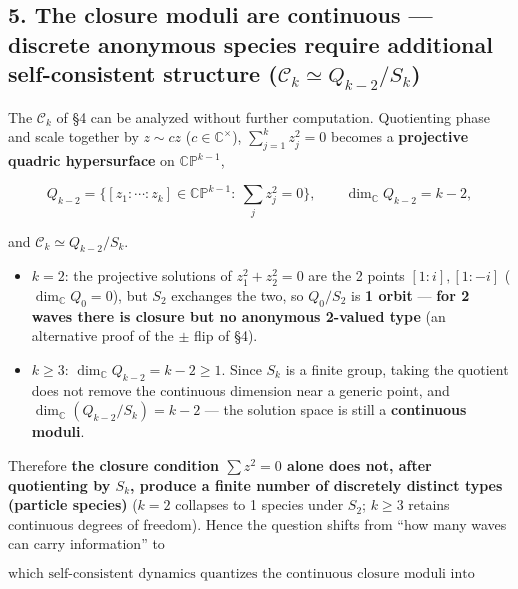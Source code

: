 \documentclass[
  a4paper,
]{ltjsarticle}
\providecommand{\tightlist}{%
  \setlength{\itemsep}{0pt}\setlength{\parskip}{0pt}}
\begin{document}
\subsection{\texorpdfstring{5. The closure moduli are continuous ---
discrete anonymous species require additional self-consistent structure
(\(\mathcal C_k\simeq Q_{k-2}/S_k\))}{5. The closure moduli are continuous --- discrete anonymous species require additional self-consistent structure (\textbackslash mathcal C\_k\textbackslash simeq Q\_\{k-2\}/S\_k)}}\label{the-closure-moduli-are-continuous-discrete-anonymous-species-require-additional-self-consistent-structure-mathcal-c_ksimeq-q_k-2s_k}

The \(\mathcal C_k\) of §4 can be analyzed without further computation.
Quotienting phase and scale together by \(z\sim cz\)
(\(c\in\mathbb C^\times\)), \(\sum_{j=1}^k z_j^2=0\) becomes a
\textbf{projective quadric hypersurface} on \(\mathbb{CP}^{k-1}\),

\[Q_{k-2}=\Big\{[z_1:\cdots:z_k]\in\mathbb{CP}^{k-1}:\ \textstyle\sum_j z_j^2=0\Big\},\qquad \dim_{\mathbb C}Q_{k-2}=k-2,\]

and \(\mathcal C_k\simeq Q_{k-2}/S_k\).

\begin{itemize}
\tightlist
\item
  \textbf{\(k=2\)}: the projective solutions of \(z_1^2+z_2^2=0\) are
  the 2 points \([1:i],[1:-i]\) (\(\dim_{\mathbb C}Q_0=0\)), but \(S_2\)
  exchanges the two, so \(Q_0/S_2\) is \textbf{1 orbit} --- \textbf{for
  2 waves there is closure but no anonymous 2-valued type} (an
  alternative proof of the \(\pm\) flip of §4).
\item
  \textbf{\(k\ge3\)}: \(\dim_{\mathbb C}Q_{k-2}=k-2\ge1\). Since \(S_k\)
  is a finite group, taking the quotient does not remove the continuous
  dimension near a generic point, and
  \(\dim_{\mathbb C}(Q_{k-2}/S_k)=k-2\) --- the solution space is still
  a \textbf{continuous moduli}.
\end{itemize}

Therefore \textbf{the closure condition \(\sum z^2=0\) alone does not,
after quotienting by \(S_k\), produce a finite number of discretely
distinct types (particle species)} (\(k=2\) collapses to 1 species under
\(S_2\); \(k\ge3\) retains continuous degrees of freedom). Hence the
question shifts from ``how many waves can carry information'' to

\[\boxed{\text{which self-consistent dynamics quantizes the continuous closure moduli into discrete types}}\]
\end{document}

